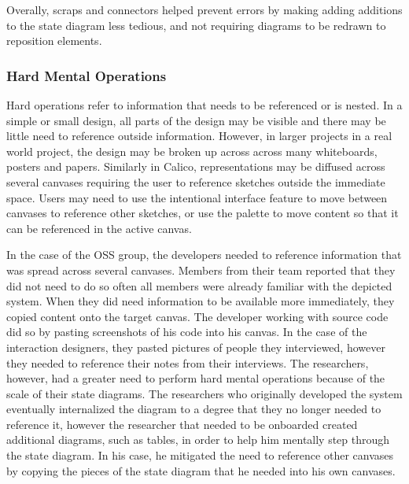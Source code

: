 Overally, scraps and connectors helped prevent errors by making adding additions to the state diagram less tedious, and not requiring diagrams to be redrawn to reposition elements.

%


\subsubsection{Hard Mental Operations}
Hard operations refer to information that needs to be referenced or is nested. In a simple or small design, all parts of the design may be visible and there may be little need to reference outside information. However, in larger projects in a real world project, the design may be broken up across across many whiteboards, posters and papers. Similarly in Calico, representations may be diffused across several canvases requiring the user to reference sketches outside the immediate space. Users may need to use the intentional interface feature to move between canvases to reference other sketches, or use the palette to move content so that it can be referenced in the active canvas.

In the case of the OSS group, the developers needed to reference information that was spread across several canvases. Members from their team reported that they did not need to do so often all members were already familiar with the depicted system. When they did need information to be available more immediately, they copied content onto the target canvas. The developer working with source code did so by pasting screenshots of his code into his canvas. In the case of the interaction designers, they pasted pictures of people they interviewed, however they needed to reference their notes from their interviews. The researchers, however, had a greater need to perform hard mental operations because of the scale of their state diagrams. The researchers who originally developed the system eventually internalized the diagram to a degree that they no longer needed to reference it, however the researcher that needed to be onboarded created additional diagrams, such as tables, in order to help him mentally step through the state diagram. In his case, he mitigated the need to reference other canvases by copying the pieces of the state diagram that he needed into his own canvases.

